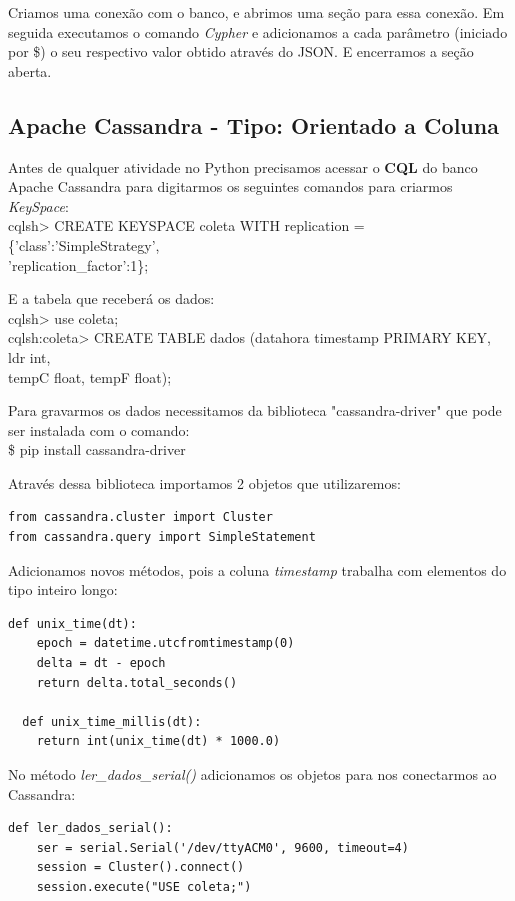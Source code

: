 \documentclass[a4paper,11pt]{article}
\begin{document}
Criamos uma conexão com o banco, e abrimos uma seção para essa conexão. Em seguida executamos o comando \textit{Cypher} e adicionamos a cada parâmetro (iniciado por {\ttfamily\$}) o seu respectivo valor obtido através do JSON. E encerramos a seção aberta.

\subsection*{Apache Cassandra - Tipo: Orientado a Coluna}
Antes de qualquer atividade no Python precisamos acessar o \textbf{CQL} do banco Apache Cassandra para digitarmos os seguintes comandos para criarmos \textit{KeySpace}: \\
{\ttfamily cqlsh> CREATE KEYSPACE coleta WITH replication = \{'class':'SimpleStrategy', \\ 'replication\_factor':1\};} 

E a tabela que receberá os dados: \\
{\ttfamily cqlsh> use coleta;} \\
{\ttfamily cqlsh:coleta> CREATE TABLE dados (datahora timestamp PRIMARY KEY, ldr int, \\ tempC float, tempF float);}

Para gravarmos os dados necessitamos da biblioteca "cassandra-driver" que pode ser instalada com o comando: \\
{\ttfamily\$ pip install cassandra-driver}

Através dessa biblioteca importamos 2 objetos que utilizaremos:
\begin{lstlisting}[]
from cassandra.cluster import Cluster
from cassandra.query import SimpleStatement
\end{lstlisting}

Adicionamos novos métodos, pois a coluna \textit{timestamp} trabalha com elementos do tipo inteiro longo:
\begin{lstlisting}[]
  def unix_time(dt):
    epoch = datetime.utcfromtimestamp(0)
    delta = dt - epoch
    return delta.total_seconds()
	
  def unix_time_millis(dt):
    return int(unix_time(dt) * 1000.0)
\end{lstlisting}

No método \textit{ler\_dados\_serial()} adicionamos os objetos para nos conectarmos ao Cassandra:
\begin{lstlisting}[]
  def ler_dados_serial():
	ser = serial.Serial('/dev/ttyACM0', 9600, timeout=4)
	session = Cluster().connect()
	session.execute("USE coleta;")
\end{lstlisting}
\end{document}
